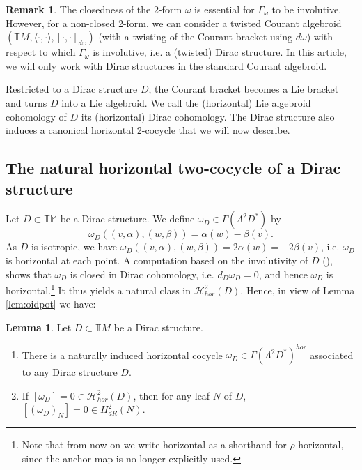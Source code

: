 \documentclass[a4paper,12pt]{amsart}
\theoremstyle{definition}
\newtheorem{Lemma}[Definition]{Lemma}
\newtheorem{Remark}[Definition]{Remark}
\newcommand{\leaf}[0]{{N}}
\begin{document}
\begin{Remark}
The closedness of the 2-form $\omega$ is essential for $\Gamma_\omega$ to be involutive. However, for a non-closed 2-form, we can consider a twisted Courant algebroid $(\mathbb TM,\langle\cdot,\cdot\rangle, [\cdot,\cdot]_{d\omega})$ (with a twisting of the Courant bracket using $d\omega$) with respect to which $\Gamma_\omega$ is involutive, i.e. a (twisted) Dirac structure. In this article, we will only work with Dirac structures in the standard Courant algebroid.
\end{Remark}



Restricted to a Dirac structure $D$, the Courant bracket becomes a Lie bracket and turns $D$ into a Lie algebroid. We call the ({horizontal}) Lie algebroid cohomology of $D$ its ({horizontal}) Dirac cohomology. The Dirac structure also induces a canonical  {horizontal} 2-cocycle that we will now describe.

\subsection{The natural  {horizontal} two-cocycle of a Dirac structure}
Let $D\subset \mathbb  {TM}$ be a 
Dirac structure. We define $\omega_D\in\Gamma(\Lambda^2D^*)$ by $$\omega_D((v,\alpha),(w,\beta))=\alpha(w)-\beta(v).$$  
 As $D$ is isotropic, we have $\omega_D((v,\alpha),(w,\beta))=2\alpha(w)=-2\beta(v)$, i.e. $\omega_D$ is horizontal  {at each point}.
A computation based on the involutivity of $D$ (\cite{burs}), shows that $\omega_D$ is closed in Dirac cohomology, i.e. $d_D\omega_D=0$, and hence $\omega_D$ is  {horizontal}.\footnote{  
 {Note that from now on we write  {horizontal} as a shorthand for $\rho$-horizontal, since the anchor map is no longer explicitly used.}}
It thus yields a natural class in $\mathcal H^2_{{hor}}(D)$.
Hence, in view of Lemma \ref{lem:oidpot} we have:

\begin{Lemma}Let $D\subset \mathbb TM$ be a Dirac structure.
\begin{enumerate}
    \item There is a naturally induced  {horizontal} cocycle $\omega_D\in \Gamma(\Lambda^2D^*)^{{hor}}$ 
associated to any Dirac structure $D$.
\item If $[\omega_D]=0\in \mathcal{H}_{{hor}}^2(D)$, then for any leaf $\leaf$ of $D$, $[(\omega_D)_\leaf]=0\in H^2_{dR}(\leaf)$.
\end{enumerate}
\end{Lemma}
\end{document}
